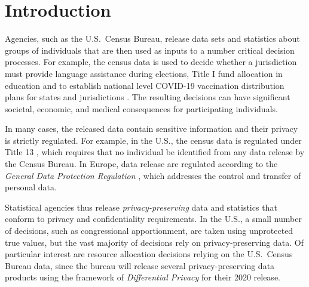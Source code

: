 \section*{Introduction}

Agencies, such as the U.S.~Census Bureau, release data sets and
statistics about groups of individuals that are then used as inputs to
a number critical decision processes. For example, the census data is
used to decide whether a jurisdiction must provide language assistance
during elections, Title I fund allocation in education \cite{pujol:20}
and to establish national level COVID-19 vaccination distribution plans
for states and jurisdictions \cite{covid}.
The resulting decisions can have significant societal, economic, and medical
consequences for participating individuals.

In many cases, the released data
contain sensitive information and their privacy is strictly regulated.
For example, in the U.S., the census data is regulated under Title 13
\cite{title13}, which requires that no individual be identified from
any data release by the Census Bureau. In Europe, data release are
regulated according to the \emph{General Data Protection Regulation}
\cite{GDPR}, which addresses the control and transfer of personal data.

Statistical agencies thus release \emph{privacy-preserving} data and
statistics that conform to privacy and confidentiality requirements.
In the U.S., a small number of decisions, such as congressional
apportionment, are taken using unprotected true values, but the vast
majority of decisions rely on privacy-preserving data. Of particular
interest are resource allocation decisions relying on the U.S.~Census
Bureau data, since the bureau will release several privacy-preserving
data products using the framework of \emph{Differential Privacy} \cite{abowd2018us}
for their 2020 release.

